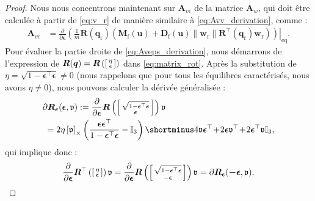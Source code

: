 \begin{proof}
Nous nous concentrons maintenant sur $\boldsymbol{A}_{v\epsilon}$ de la matrice $\boldsymbol{A}_{w}$, qui doit être calculée à partir de \eqref{eq:v_r} de manière similaire à \eqref{eq:Avv_derivation}, comme :
\begin{align}
\boldsymbol{A}_{v\epsilon} &\!=\! \frac{\partial }{\partial \boldsymbol{\epsilon}}  \left. \left( \frac{1}{m} \boldsymbol{R}(\boldsymbol{q}_{\text{r}}) \left( 
\boldsymbol{M}_{\text{f}}(\boldsymbol{u}) +  
\boldsymbol{D}_{\text{f}}(\boldsymbol{u}) \lVert \boldsymbol{w}_{\text{r}} \rVert \boldsymbol{R}^\top \!(\boldsymbol{q}_{\mathrm{r}}) \boldsymbol{w}_{\text{r}}  \right) \right)\right|_{\text{eq}}.
\label{eq:Aveps_derivation}
\end{align} 
Pour évaluer la partie droite de \eqref{eq:Aveps_derivation}, nous démarrons de l'expression de $\boldsymbol{R}(\boldsymbol{q}) = \boldsymbol{R}\left( \left[ \begin{smallmatrix}\eta \\ \epsilon \end{smallmatrix} \right]\right)$ dans \eqref{eq:matrix_rot}. Après la substitution de $\eta = \sqrt{1-\boldsymbol{\epsilon}^\top \boldsymbol{\epsilon}} \neq 0$
(nous rappelons que pour tous les équilibres caractérisés, nous avons $\eta \neq 0$), nous pouvons calculer la dérivée généralisée : 
\begin{align}
\label{eq:diffR_eps}
&\partial \boldsymbol{R}_{\boldsymbol{ \epsilon}} (\boldsymbol{ \epsilon},\mathfrak{v}) := \frac{\partial }{\partial \boldsymbol{\epsilon}}
\boldsymbol{R}\left(
\smallmat{\sqrt{1-\boldsymbol{\epsilon}^\top \boldsymbol{\epsilon}} \\ \boldsymbol{\epsilon}}
\right) \mathfrak{v}  \\
\nonumber
&\; = 2 \eta \skewsym{\mathfrak{v}} \left( \frac{\boldsymbol{\epsilon}\boldsymbol{\epsilon}^\top}{1-\boldsymbol{\epsilon}^\top \boldsymbol{\epsilon}} - \mathbb{I}_{3}  \right) \shortminus 4 \mathfrak{v} \boldsymbol{\epsilon}^\top \! + \!2\boldsymbol{\epsilon} \mathfrak{v}^\top \!+ \! 2\boldsymbol{\epsilon}^\top \mathfrak{v} \mathbb{I}_{3},
\end{align}
qui implique donc : 
\begin{align}
\label{eq:diffRtop}
    \frac{\partial }{\partial \boldsymbol{\epsilon}}
\boldsymbol{R}^\top\left(
\smallmat{\eta \\ \boldsymbol{\epsilon}}
\right) \mathfrak{v} =
    \frac{\partial }{\partial \boldsymbol{\epsilon}}
\boldsymbol{R}\left(
\smallmat{\sqrt{1-\boldsymbol{\epsilon}^\top \boldsymbol{\epsilon}} \\ -\boldsymbol{\epsilon}}
\right) \mathfrak{v} = \partial \boldsymbol{R}_{\boldsymbol{ \epsilon}} (\boldsymbol{ -\epsilon},\mathfrak{v}).

\end{align}
\end{proof}
